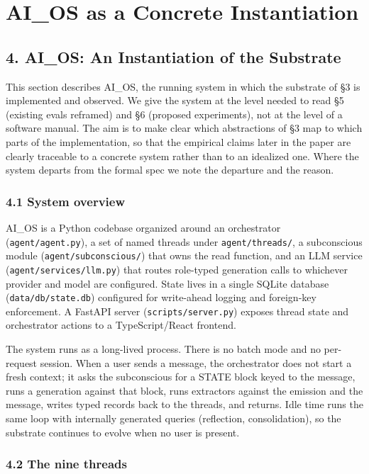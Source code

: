 \documentclass[11pt,letterpaper]{article}
\begin{document}
\section{AI\_OS as a Concrete Instantiation}
\subsection*{4. AI\_OS: An Instantiation of the Substrate}

This section describes AI\_OS, the running system in which the substrate of §3 is implemented and observed. We give the system at the level needed to read §5 (existing evals reframed) and §6 (proposed experiments), not at the level of a software manual. The aim is to make clear which abstractions of §3 map to which parts of the implementation, so that the empirical claims later in the paper are clearly traceable to a concrete system rather than to an idealized one. Where the system departs from the formal spec we note the departure and the reason.

\subsubsection*{4.1 System overview}

AI\_OS is a Python codebase organized around an orchestrator (\texttt{agent/agent.py}), a set of named threads under \texttt{agent/threads/}, a subconscious module (\texttt{agent/subconscious/}) that owns the read function, and an LLM service (\texttt{agent/services/llm.py}) that routes role-typed generation calls to whichever provider and model are configured. State lives in a single SQLite database (\texttt{data/db/state.db}) configured for write-ahead logging and foreign-key enforcement. A FastAPI server (\texttt{scripts/server.py}) exposes thread state and orchestrator actions to a TypeScript/React frontend.

The system runs as a long-lived process. There is no batch mode and no per-request session. When a user sends a message, the orchestrator does not start a fresh context; it asks the subconscious for a STATE block keyed to the message, runs a generation against that block, runs extractors against the emission and the message, writes typed records back to the threads, and returns. Idle time runs the same loop with internally generated queries (reflection, consolidation), so the substrate continues to evolve when no user is present.

\subsubsection*{4.2 The nine threads}
\end{document}
